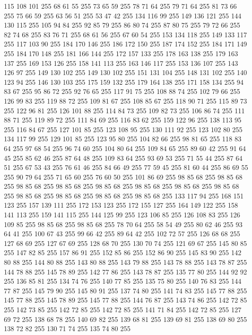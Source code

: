 115 108 101 255 68 61 55 255 73 65 59 255 78 71 64 255 79 71 64 255 81 73 66 255 75 66 59 255 63 56 51 255 53 47 42 255 134 116 99 255 149 136 121 255 144 130 115 255 105 94 84 255 92 85 79 255 86 80 74 255 87 80 75 255 79 72 66 255 82 74 68 255 83 76 71 255 68 61 56 255 67 60 54 255 153 134 118 255 149 133 117 255 117 103 90 255 184 170 146 255 186 172 150 255 187 174 152 255 184 171 149 255 184 170 148 255 181 166 144 255 172 157 133 255 178 163 138 255 179 163 137 255 169 153 126 255 158 141 113 255 163 146 117 255 153 136 107 255 143 126 97 255 149 130 102 255 149 130 102 255 151 131 104 255 148 131 102 255 140 123 94 255 146 130 103 255 175 159 132 255 179 164 138 255 171 158 134 255 94 83 67 255 95 86 72 255 92 76 65 255 117 91 75 255 108 88 74 255 102 79 66 255 126 99 83 255 119 88 72 255 109 81 67 255 108 85 67 255 118 90 71 255 115 89 73 255 122 96 81 255 126 101 88 255 114 84 73 255 109 82 73 255 106 86 74 255
111 88 71 255 119 89 72 255 111 84 69 255 116 83 62 255 159 122 96 255 138 113 95 255 116 84 67 255 127 101 85 255 123 108 95 255 130 111 92 255 123 102 80 255 134 117 99 255 129 101 85 255 123 95 80 255 104 82 66 255 98 81 65 255 118 83 64 255 97 68 54 255 96 74 60 255 104 80 64 255 109 84 65 255 89 60 42 255 91 64 45 255 85 62 46 255 87 64 48 255 109 83 64 255 93 69 53 255 71 55 44 255 87 64 51 255 67 53 43 255 76 61 46 255 84 66 49 255 77 59 45 255 81 60 44 255 86 69 55 255 90 79 64 255 71 65 60 255 76 60 50 255 101 86 69 255 98 85 68 255 98 85 68 255 98 85 68 255 98 85 68 255 98 85 68 255 98 85 68 255 98 85 68 255 98 85 68 255 98 85 68 255 98 85 68 255 98 85 68 255 98 85 68 255 133 117 94 255 168 151 123 255 157 139 111 255 172 153 123 255 172 155 127 255 164 149 122 255 158 141 113 255 159 141 115 255 144 125 99 255 123 106 85 255 126 108 83 255 126 109 85 255 98 85 68 255
98 85 68 255 78 70 64 255 58 54 49 255 80 62 46 255 93 64 41 255 100 67 43 255 99 66 42 255 89 64 42 255 102 72 57 255 126 68 68 255 127 68 69 255 127 67 69 255 128 68 70 255 130 70 74 255 121 69 67 255 145 80 85 255 147 82 85 255 157 86 91 255 152 85 86 255 152 86 90 255 145 83 90 255 142 80 88 255 144 80 88 255 143 80 88 255 143 79 88 255 143 78 88 255 143 78 87 255 144 78 88 255 145 78 89 255 142 77 86 255 143 78 87 255 135 77 80 255 144 92 92 255 136 85 81 255 134 74 76 255 140 77 85 255 135 75 80 255 140 76 83 255 144 77 87 255 145 79 90 255 145 80 91 255 137 74 80 255 141 74 83 255 145 77 88 255 145 77 88 255 145 78 89 255 145 77 88 255 144 76 87 255 143 74 86 255 142 72 85 255 142 73 85 255 142 72 85 255 142 72 85 255 141 71 84 255 142 72 85 255 127 69 72 255 138 68 78 255 140 69 82 255 139 68 81 255 139 69 81 255 138 69 80 255 138 72 82 255 130 71 74 255 135 74 80 255
